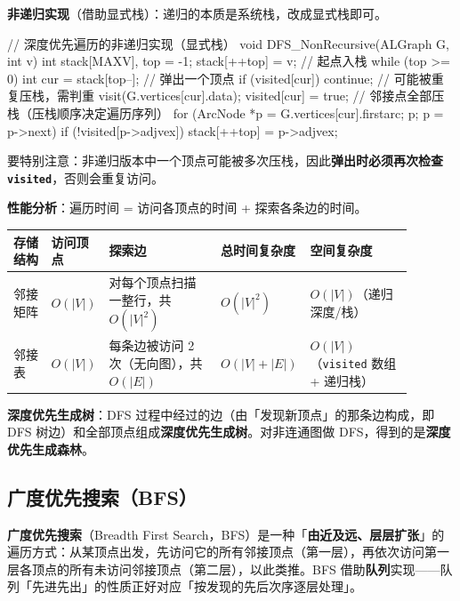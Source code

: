 \documentclass[11pt,openany,UTF8]{ctexbook}
\begin{document}
\textbf{非递归实现}（借助显式栈）：递归的本质是系统栈，改成显式栈即可。

\begin{codebox}
// 深度优先遍历的非递归实现（显式栈）
void DFS_NonRecursive(ALGraph G, int v) {
    int stack[MAXV], top = -1;
    stack[++top] = v;                // 起点入栈
    while (top >= 0) {
        int cur = stack[top--];      // 弹出一个顶点
        if (visited[cur]) continue;  // 可能被重复压栈，需判重
        visit(G.vertices[cur].data);
        visited[cur] = true;
        // 邻接点全部压栈（压栈顺序决定遍历序列）
        for (ArcNode *p = G.vertices[cur].firstarc; p; p = p->next) {
            if (!visited[p->adjvex])
                stack[++top] = p->adjvex;
        }
    }
}
\end{codebox}

要特别注意：非递归版本中一个顶点可能被多次压栈，因此\textbf{弹出时必须再次检查 \texttt{visited}}，否则会重复访问。

\textbf{性能分析}：遍历时间 = 访问各顶点的时间 + 探索各条边的时间。

\begingroup\small\setlength{\tabcolsep}{4.0pt}
\begin{longtable}{@{}L{0.1062\linewidth}L{0.1062\linewidth}L{0.3010\linewidth}L{0.1062\linewidth}L{0.2744\linewidth}@{}}
\toprule
\textbf{存储结构} & \textbf{访问顶点} & \textbf{探索边} & \textbf{总时间复杂度} & \textbf{空间复杂度} \\
\midrule
\endhead
邻接矩阵 & $O(\lvert V\rvert)$ & 对每个顶点扫描一整行，共 $O(\lvert V\rvert^{2})$ & $O(\lvert V\rvert^{2})$ & $O(\lvert V\rvert)$（递归深度/栈） \\
邻接表 & $O(\lvert V\rvert)$ & 每条边被访问 2 次（无向图），共 $O(\lvert E\rvert)$ & $O(\lvert V\rvert+\lvert E\rvert)$ & $O(\lvert V\rvert)$（\texttt{visited} 数组 + 递归栈） \\
\bottomrule
\end{longtable}
\endgroup

\textbf{深度优先生成树}：DFS 过程中经过的边（由「发现新顶点」的那条边构成，即 DFS 树边）和全部顶点组成\textbf{深度优先生成树}。对非连通图做 DFS，得到的是\textbf{深度优先生成森林}。

\subsection{广度优先搜索（BFS）}

\textbf{广度优先搜索}（Breadth First Search，BFS）是一种「\textbf{由近及远、层层扩张}」的遍历方式：从某顶点出发，先访问它的所有邻接顶点（第一层），再依次访问第一层各顶点的所有未访问邻接顶点（第二层），以此类推。BFS 借助\textbf{队列}实现——队列「先进先出」的性质正好对应「按发现的先后次序逐层处理」。
\end{document}
